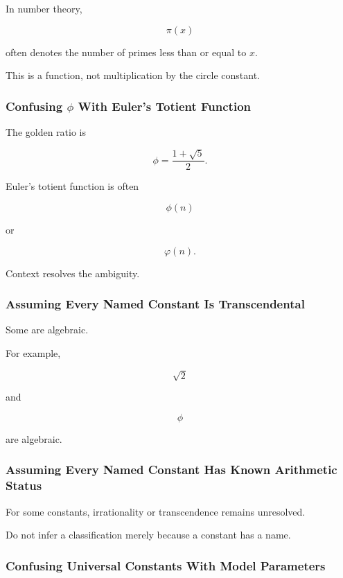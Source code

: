 In number theory,

\[
\boxed{
\pi(x)
}
\]

often denotes the number of primes less than or equal to \(x\).

This is a function, not multiplication by the circle constant.

\subsubsection{Confusing \(\phi\) With Euler's Totient Function}

The golden ratio is

\[
\boxed{
\phi
=
\frac{1+\sqrt5}{2}.
}
\]

Euler's totient function is often

\[
\boxed{
\phi(n)
}
\]

or

\[
\boxed{
\varphi(n).
}
\]

Context resolves the ambiguity.

\subsubsection{Assuming Every Named Constant Is Transcendental}

Some are algebraic.

For example,

\[
\boxed{
\sqrt2
}
\]

and

\[
\boxed{
\phi
}
\]

are algebraic.

\subsubsection{Assuming Every Named Constant Has Known Arithmetic Status}

For some constants, irrationality or transcendence remains unresolved.

Do not infer a classification merely because a constant has a name.

\subsubsection{Confusing Universal Constants With Model Parameters}

